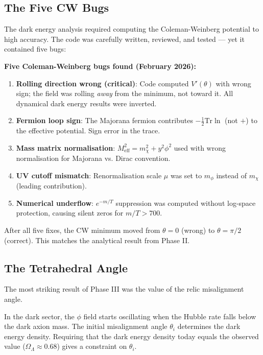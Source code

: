 \documentclass[12pt, a4paper]{article}
\begin{document}
\subsection{The Five CW Bugs}

The dark energy analysis required computing the Coleman-Weinberg potential to high accuracy. The code was carefully written, reviewed, and tested --- yet it contained five bugs:

\begin{failbox}
\textbf{Five Coleman-Weinberg bugs found (February 2026):}
\begin{enumerate}[leftmargin=*]
  \item \textbf{Rolling direction wrong (critical)}: Code computed $V'(\theta)$ with wrong sign; the field was rolling \emph{away} from the minimum, not toward it. All dynamical dark energy results were inverted.
  \item \textbf{Fermion loop sign}: The Majorana fermion contributes $-\frac{1}{2}\text{Tr}\ln$ (not $+$) to the effective potential. Sign error in the trace.
  \item \textbf{Mass matrix normalisation}: $M_\text{eff}^2 = m_\chi^2 + y^2\phi^2$ used with wrong normalisation for Majorana vs. Dirac convention.
  \item \textbf{UV cutoff mismatch}: Renormalisation scale $\mu$ was set to $m_\phi$ instead of $m_\chi$ (leading contribution).
  \item \textbf{Numerical underflow}: $e^{-m/T}$ suppression was computed without log-space protection, causing silent zeros for $m/T > 700$.
\end{enumerate}
After all five fixes, the CW minimum moved from $\theta = 0$ (wrong) to $\theta = \pi/2$ (correct). This matches the analytical result from Phase II.
\end{failbox}

\subsection{The Tetrahedral Angle}

The most striking result of Phase III was the value of the relic misalignment angle.

In the dark sector, the $\phi$ field starts oscillating when the Hubble rate falls below the dark axion mass. The initial misalignment angle $\theta_i$ determines the dark energy density. Requiring that the dark energy density today equals the observed value ($\Omega_\Lambda \approx 0.68$) gives a constraint on $\theta_i$.
\end{document}
